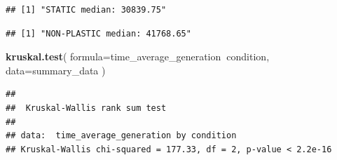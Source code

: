 \documentclass[]{book}
\newenvironment{Shaded}{\begin{snugshade}}{\end{snugshade}}
\newcommand{\DataTypeTok}[1]{\textcolor[rgb]{0.13,0.29,0.53}{#1}}
\newcommand{\KeywordTok}[1]{\textcolor[rgb]{0.13,0.29,0.53}{\textbf{#1}}}
\newcommand{\NormalTok}[1]{#1}
\newcommand{\OperatorTok}[1]{\textcolor[rgb]{0.81,0.36,0.00}{\textbf{#1}}}
\newcommand{\StringTok}[1]{\textcolor[rgb]{0.31,0.60,0.02}{#1}}
\begin{document}
\begin{Shaded}
\end{Shaded}

\begin{verbatim}
## [1] "STATIC median: 30839.75"
\end{verbatim}

\begin{Shaded}
\end{Shaded}

\begin{verbatim}
## [1] "NON-PLASTIC median: 41768.65"
\end{verbatim}

\begin{Shaded}
\begin{Highlighting}[]
\KeywordTok{kruskal.test}\NormalTok{(}
  \DataTypeTok{formula=}\NormalTok{time_average_generation}\OperatorTok{~}\NormalTok{condition,}
  \DataTypeTok{data=}\NormalTok{summary_data}
\NormalTok{)}
\end{Highlighting}
\end{Shaded}

\begin{verbatim}
## 
##  Kruskal-Wallis rank sum test
## 
## data:  time_average_generation by condition
## Kruskal-Wallis chi-squared = 177.33, df = 2, p-value < 2.2e-16
\end{verbatim}

\begin{Shaded}
\end{Shaded}
\end{document}
